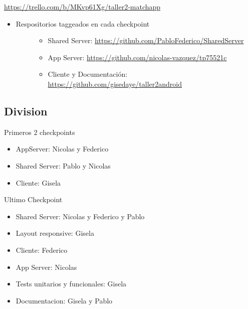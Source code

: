 \documentclass[letterpaper,10pt,english]{sphinxmanual}
\begin{document}
\href{https://trello.com/b/MKvp61Xg/taller2-matchapp}{https://trello.com/b/MKvp61Xg/taller2-matchapp}
\begin{itemize}
\item {} \begin{description}
\item[{Respositorios taggeados en cada checkpoint}] \leavevmode\begin{itemize}
\item {} 
Shared Server: \href{https://github.com/PabloFederico/SharedServer}{https://github.com/PabloFederico/SharedServer}

\item {} 
App Server: \href{https://github.com/nicolas-vazquez/tp75521c}{https://github.com/nicolas-vazquez/tp75521c}

\item {} 
Cliente y Documentación: \href{https://github.com/gisedaye/taller2android}{https://github.com/gisedaye/taller2android}

\end{itemize}

\end{description}

\end{itemize}


\subsection{Division}
\label{manuals:division}
Primeros 2 checkpoints
\begin{itemize}
\item {} 
AppServer: Nicolas y Federico

\item {} 
Shared Server: Pablo y Nicolas

\item {} 
Cliente: Gisela

\end{itemize}

Ultimo Checkpoint
\begin{itemize}
\item {} 
Shared Server: Nicolas y Federico y Pablo

\item {} 
Layout responsive: Gisela

\item {} 
Cliente: Federico

\item {} 
App Server: Nicolas

\item {} 
Tests unitarios y funcionales: Gisela

\item {} 
Documentacion: Gisela y Pablo

\end{itemize}
\end{document}
